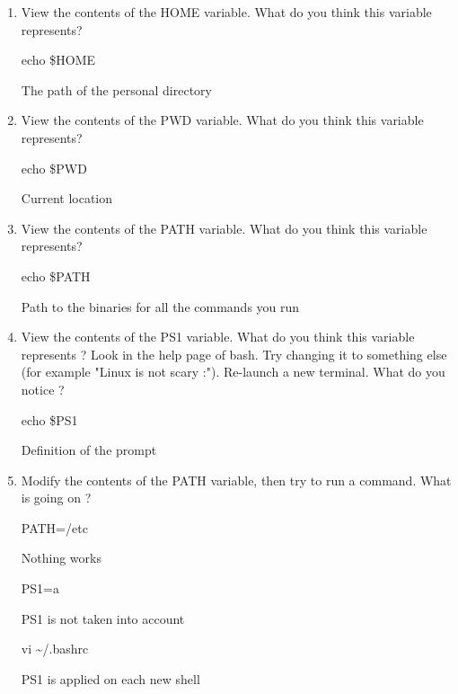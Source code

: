 \documentclass[11pt]{article}
\begin{document}
\begin{enumerate}
 \item View the contents of the HOME variable. What do you think this variable represents?
\begin{solution}
echo \$HOME

The path of the personal directory
\end{solution}
 \item View the contents of the PWD variable. What do you think this variable represents?
\begin{solution}
echo \$PWD

Current location
\end{solution}
 \item View the contents of the PATH variable. What do you think this variable represents?
\begin{solution}
echo \$PATH

Path to the binaries for all the commands you run
\end{solution}
 \item View the contents of the PS1 variable. What do you think this variable represents ? Look in the help
page of bash. Try changing it to something else (for example "Linux is not scary :"). Re-launch a
new terminal. What do you notice ?
\begin{solution}
echo \$PS1

Definition of the prompt
\end{solution}
 \item Modify the contents of the PATH variable, then try to run a command. What is going on ?
\begin{solution}
PATH=/etc

Nothing works
\end{solution}
\begin{solution}
PS1=a

PS1 is not taken into account
\end{solution}
\begin{solution}
vi \textasciitilde{}/.bashrc

PS1 is applied on each new shell
\end{solution}
\end{enumerate}
\end{document}
